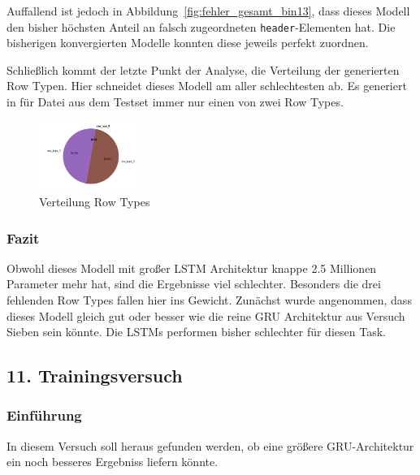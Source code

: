 \documentclass[pdftex,a4paper,halfparskip, article]{scrartcl}
\begin{document}
\begin{figure}
\begin{minipage}{.33\textwidth}
  \label{fig:fehler_schlechteste20_bin13}
\end{minipage}%
\end{figure}

Auffallend ist jedoch in Abbildung~\ref{fig:fehler_gesamt_bin13}, dass dieses Modell den bisher höchsten Anteil an falsch zugeordneten \texttt{header}-Elementen hat. Die bisherigen konvergierten Modelle konnten diese jeweils perfekt zuordnen. 

Schließlich kommt der letzte Punkt der Analyse, die Verteilung der generierten Row Typen. Hier schneidet dieses Modell am aller schlechtesten ab. Es generiert in für Datei aus dem Testset immer nur einen von zwei Row Types. 

\begin{figure}[h]
\centering
\includegraphics[width=0.3\textwidth]{predictions_bin13_predicted_row_type_distribution}
\caption{Verteilung Row Types}
\label{fig:bin13_row_type}
\end{figure}


\subsubsection*{Fazit}

Obwohl dieses Modell mit großer LSTM Architektur knappe 2.5 Millionen Parameter mehr hat, sind die Ergebnisse viel schlechter. Besonders die drei fehlenden Row Types fallen hier ins Gewicht. Zunächst wurde angenommen, dass dieses Modell gleich gut oder besser wie die reine GRU Architektur aus Versuch Sieben sein könnte. Die LSTMs performen bisher schlechter für diesen Task. 




\subsection{11. Trainingsversuch}


\subsubsection*{Einführung}
In diesem Versuch soll heraus gefunden werden, ob eine größere GRU-Architektur ein noch besseres Ergebniss liefern könnte.
\end{document}
